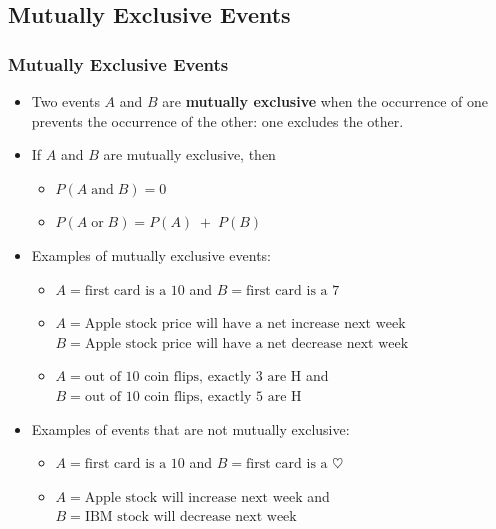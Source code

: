 \documentclass[t]{beamer}
\begin{document}
\subsection{Mutually Exclusive Events}
\begin{frame}
\frametitle{Mutually Exclusive Events}

{\small
\begin{itemize}
\item Two events $A$ and $B$ are \textbf{mutually exclusive} when the occurrence of one
  prevents the occurrence of the other:  one excludes the other.
\item If $A$ and $B$ are mutually exclusive, then \\[-2pt]
  \begin{itemize}
   \item \footnotesize $P(A\;\mbox{and}\; B)=0$\\[3pt]
   \item \footnotesize $P(A\;\mbox{or}\; B) = P(A)\; + \; P(B)$\vspace{-2pt}
   \end{itemize}
\item Examples of mutually exclusive events:
  \begin{itemize}
  \item \footnotesize $A=\mbox{first card is a 10}$ and $B=\mbox{first card is a 7}$\\[3pt]
  \item \footnotesize $A=\mbox{Apple stock price will have a net increase next week}$\\
                       $B=\mbox{Apple stock price will have a net decrease next week}$\\[3pt]
  \item \footnotesize $A=\mbox{out of 10 coin flips, exactly 3 are H}$ and
$B=\mbox{out of 10 coin flips, exactly 5 are H}$
  \end{itemize}
\item Examples of events that are not mutually exclusive:
  \begin{itemize}
  \item \footnotesize $A=\mbox{first card is a 10}$ and $B=\mbox{first card is a $\heartsuit$}$\\[3pt]
  \item \footnotesize $A=\mbox{Apple stock will increase next week}$ and $B=\mbox{IBM stock will decrease next week}$
  \end{itemize}
\end{itemize}
}
\end{frame}
\end{document}
